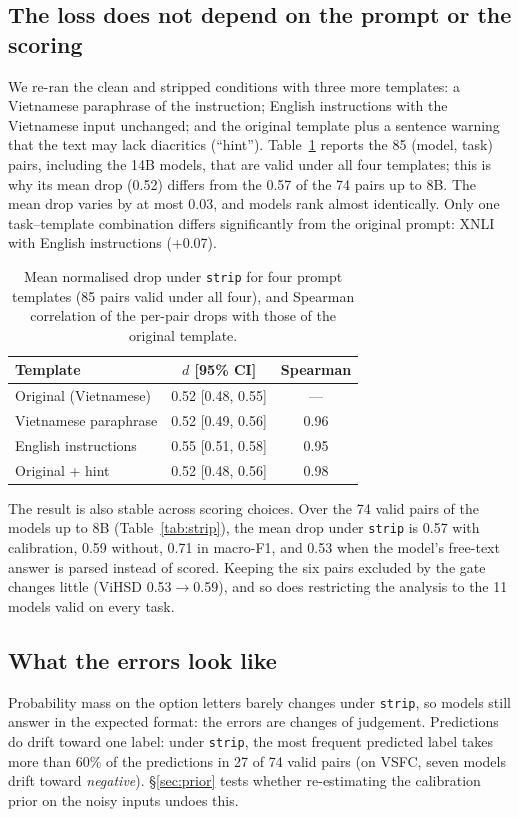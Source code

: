 \documentclass[conference]{IEEEtran}
\begin{document}
\subsection{The loss does not depend on the prompt or the scoring}\label{sec:prompts}
We re-ran the clean and stripped conditions with three more templates: a Vietnamese paraphrase of the instruction; English instructions with the Vietnamese input unchanged; and the original template plus a sentence warning that the text may lack diacritics (``hint''). Table~\ref{tab:prompts} reports the 85 (model, task) pairs, including the 14B models, that are valid under all four templates; this is why its mean drop (0.52) differs from the 0.57 of the 74 pairs up to 8B. The mean drop varies by at most 0.03, and models rank almost identically. Only one task--template combination differs significantly from the original prompt: XNLI with English instructions (+0.07).

\begin{table}[t]
\centering
\caption{Mean normalised drop under \texttt{strip} for four prompt templates (85 pairs valid under all four), and Spearman correlation of the per-pair drops with those of the original template.}
\label{tab:prompts}
\begin{tabular}{@{}lcc@{}}
\toprule
Template & $d$ [95\% CI] & Spearman \\
\midrule
Original (Vietnamese) & 0.52 [0.48, 0.55] & --- \\
Vietnamese paraphrase & 0.52 [0.49, 0.56] & 0.96 \\
English instructions  & 0.55 [0.51, 0.58] & 0.95 \\
Original + hint       & 0.52 [0.48, 0.56] & 0.98 \\
\bottomrule
\end{tabular}
\end{table}

The result is also stable across scoring choices. Over the 74 valid pairs of the models up to 8B (Table~\ref{tab:strip}), the mean drop under \texttt{strip} is 0.57 with calibration, 0.59 without, 0.71 in macro-F1, and 0.53 when the model's free-text answer is parsed instead of scored. Keeping the six pairs excluded by the gate changes little (ViHSD 0.53$\rightarrow$0.59), and so does restricting the analysis to the 11 models valid on every task.

\subsection{What the errors look like}
Probability mass on the option letters barely changes under \texttt{strip}, so models still answer in the expected format: the errors are changes of judgement. Predictions do drift toward one label: under \texttt{strip}, the most frequent predicted label takes more than 60\% of the predictions in 27 of 74 valid pairs (on VSFC, seven models drift toward \textit{negative}). \S\ref{sec:prior} tests whether re-estimating the calibration prior on the noisy inputs undoes this.
\end{document}
